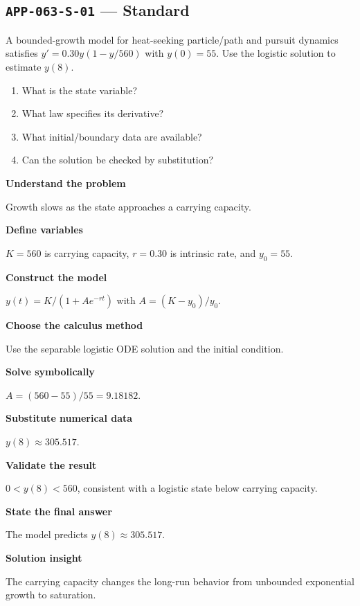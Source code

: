 \documentclass[11pt]{book}
\newcommand{\pid}[1]{\texttt{#1}}
\begin{document}
\subsection*{\pid{APP-063-S-01} — Standard}
\begin{problembox}
A bounded-growth model for heat-seeking particle/path and pursuit dynamics satisfies $y'=0.30y(1-y/560)$ with $y(0)=55$. Use the logistic solution to estimate $y(8)$.
\end{problembox}
\begin{promptbox}\begin{enumerate}
\item What is the state variable?
\item What law specifies its derivative?
\item What initial/boundary data are available?
\item Can the solution be checked by substitution?
\end{enumerate}\end{promptbox}
\begin{solutionbox}
\textbf{Understand the problem}\par Growth slows as the state approaches a carrying capacity.\par\medskip
\textbf{Define variables}\par $K=560$ is carrying capacity, $r=0.30$ is intrinsic rate, and $y_0=55$.\par\medskip
\textbf{Construct the model}\par $y(t)=K/(1+A e^{-rt})$ with $A=(K-y_0)/y_0$.\par\medskip
\textbf{Choose the calculus method}\par Use the separable logistic ODE solution and the initial condition.\par\medskip
\textbf{Solve symbolically}\par $A=(560-55)/55=9.18182$.\par\medskip
\textbf{Substitute numerical data}\par $y(8)\approx 305.517$.\par\medskip
\textbf{Validate the result}\par $0<y(8)<560$, consistent with a logistic state below carrying capacity.\par\medskip
\textbf{State the final answer}\par The model predicts $y(8)\approx 305.517$.\par\medskip
\textbf{Solution insight}\par The carrying capacity changes the long-run behavior from unbounded exponential growth to saturation.\par\medskip
\end{solutionbox}
\end{document}
